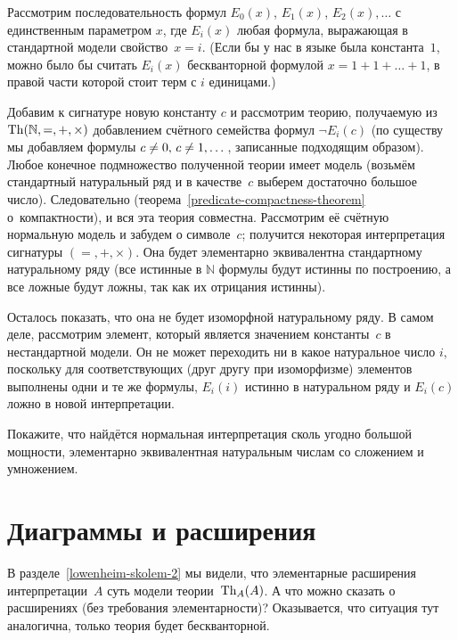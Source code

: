         \label{nonstandard-n-construction}%
Рассмотрим последовательность формул $E_0(x)$, $E_1(x)$,
$E_2(x),\dots$ с единственным параметром $x$, где $E_i(x)$\т
любая формула, выражающая в стандартной модели свойство~$x=i$.
(Если бы у нас в языке была константа~$1$, можно было бы считать
$E_i(x)$ бескванторной формулой $x=1+1+\ldots+1$, в правой части
которой стоит терм с $i$ единицами.)

Добавим к сигнатуре новую константу $c$ и рассмотрим теорию,
получаемую из $\operatorname{Th}(\mathbb{N},{=},{+},{\times})$ добавлением
счётного семейства формул $\lnot E_i(c)$ (по существу мы
добавляем формулы $c\hm\ne 0,\,c\hm\ne 1,\dots$, записанные
подходящим образом). Любое конечное подмножество полученной
теории имеет модель (возьмём стандартный натуральный ряд и в
качестве~$c$ выберем достаточно большое число). Следовательно
(теорема~\ref{predicate-compactness-theorem} о~компактности), и
вся эта теория совместна. Рассмотрим её счётную нормальную
модель и забудем о символе~$c$; получится некоторая
интерпретация сигнатуры $({=},{+},{\times})$. Она будет
элементарно эквивалентна стандартному натуральному ряду (все
истинные в $\mathbb{N}$ формулы будут истинны по построению, а
все ложные будут ложны, так как их отрицания
истинны).

Осталось показать, что она не будет изоморфной натуральному
ряду. В самом деле, рассмотрим элемент, который является
значением константы~$c$ в нестандартной модели. Он не может
переходить ни в какое натуральное число $i$, поскольку для
соответствующих (друг другу при изоморфизме) элементов выполнены
одни и те же формулы, $E_i(i)$ истинно в натуральном ряду и
$E_i(c)$ ложно в новой интерпретации.

\begin{problem}
Покажите, что найдётся нормальная интерпретация сколь угодно
большой мощности, элементарно эквивалентная натуральным числам
со сложением и умножением.
\end{problem}

\section{Диаграммы и расширения}

В разделе~\ref{lowenheim-skolem-2}
мы видели, что элементарные расширения
интерпретации~$A$ суть модели теории~$\operatorname{Th}_A(A)$. А что можно
сказать о расширениях (без требования элементарности)?
Оказывается, что ситуация тут аналогична, только теория будет
бескванторной.

